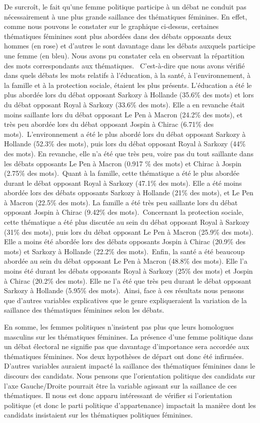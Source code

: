 \documentclass[
  letterpaper,
  DIV=11,
  numbers=noendperiod]{scrartcl}
\begin{document}
De surcroît, le fait qu'une femme politique participe à un débat ne
conduit pas nécessairement à une plus grande saillance des thématiques
féminines. En effet, comme nous pouvons le constater sur le graphique
ci-dessus, certaines thématiques féminines sont plus abordées dans des
débats opposants deux hommes (en rose) et d'autres le sont davantage
dans les débats auxquels participe une femme (en bleu). Nous avons pu
constater cela en observant la répartition des mots correspondants aux
thématiques. ~C'est-à-dire que nous avons vérifié dans quels débats les
mots relatifs à l'éducation, à la santé, à l'environnement, à la famille
et à la protection sociale, étaient les plus présents. L'éducation a été
le plus abordée lors du débat opposant Sarkozy à Hollande (35.6\% des
mots) et lors du débat opposant Royal à Sarkozy (33.6\% des mots). Elle
a en revanche était moins saillante lors du débat opposant Le Pen à
Macron (24.2\% des mots), et très peu abordée lors du débat opposant
Jospin à Chirac (6.71\% des mots).~L'environnement a été le plus abordé
lors du débat opposant Sarkozy à Hollande (52.3\% des mots), puis lors
du débat opposant Royal à Sarkozy (44\% des mots). En revanche, elle n'a
été que très peu, voire pas du tout saillante dans les débats opposants
Le Pen à Macron (0.917 \% des mots) et Chirac à Jospin (2.75\% des
mots).~Quant à la famille, cette thématique a été le plus abordée durant
le débat opposant Royal à Sarkozy (47.1\% des mots). Elle a été moins
abordée lors des débats opposants Sarkozy à Hollande (21\% des mots), et
Le Pen à Macron (22.5\% des mots). La famille a été très peu saillante
lors du débat opposant Jospin à Chirac (9.42\% des mots).~Concernant la
protection sociale, cette thématique a été plus discutée au sein du
débat opposant Royal à Sarkozy (31\% des mots), puis lors du débat
opposant Le Pen à Macron (25.9\% des mots). Elle a moins été abordée
lors des débats opposants Jospin à Chirac (20.9\% des mots) et Sarkozy à
Hollande (22.2\% des mots).~Enfin, la santé a été beaucoup abordée au
sein du débat opposant Le Pen à Macron (48.8\% des mots). Elle l'a moins
été durant les débats opposants Royal à Sarkozy (25\% des mots) et
Jospin à Chirac (20.2\% des mots). Elle ne l'a été que très peu durant
le débat opposant Sarkozy à Hollande (5.95\% des mots).~Ainsi, face à
ces résultats nous pensons que d'autres variables explicatives que le
genre expliqueraient la variation de la saillance des thématiques
féminines selon les débats.

En somme, les femmes politiques n'insistent pas plus que leurs
homologues masculins sur les thématiques féminines. La présence d'une
femme politique dans un débat électoral ne signifie pas que davantage
d'importance sera accordée aux thématiques féminines. Nos deux
hypothèses de départ ont donc été infirmées. D'autres variables auraient
impacté la saillance des thématiques féminines dans le discours des
candidats. Nous pensons que l'orientation politique des candidats sur
l'axe Gauche/Droite pourrait être la variable agissant sur la saillance
de ces thématiques. Il nous est donc apparu intéressant de vérifier si
l'orientation politique (et donc le parti politique d'appartenance)
impactait la manière dont les candidats insistaient sur les thématiques
politiques féminines.~
\end{document}
